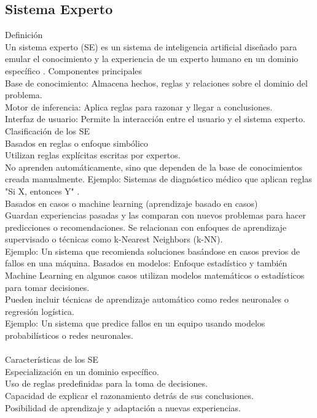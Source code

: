 \subsection{Sistema Experto}
Definición \\
Un sistema experto (SE) es un sistema de inteligencia artificial diseñado para emular el conocimiento y la experiencia de un experto humano en un dominio específico \cite{Leo}.
Componentes principales \\
Base de conocimiento: Almacena hechos, reglas y relaciones sobre el dominio del problema.\\
Motor de inferencia: Aplica reglas para razonar y llegar a conclusiones.\\
Interfaz de usuario: Permite la interacción entre el usuario y el sistema experto.\\
Clasificación de los SE \\
Basados en reglas o enfoque simbólico \\
Utilizan reglas explícitas escritas por expertos.\\
No aprenden automáticamente, sino que dependen de la base de conocimientos creada manualmente.
Ejemplo: Sistemas de diagnóstico médico que aplican reglas "Si X, entonces Y" \cite{Raul}.\\

Basados en casos o machine learning (aprendizaje basado en casos)\\
Guardan experiencias pasadas y las comparan con nuevos problemas para hacer predicciones o recomendaciones.
Se relacionan con enfoques de aprendizaje supervisado o técnicas como k-Nearest Neighbors (k-NN).\\
Ejemplo: Un sistema que recomienda soluciones basándose en casos previos de fallos en una máquina.
Basados en modelos: Enfoque estadístico y también Machine Learning en algunos casos
utilizan modelos matemáticos o estadísticos para tomar decisiones.\\
Pueden incluir técnicas de aprendizaje automático como redes neuronales o regresión logística.\\
Ejemplo: Un sistema que predice fallos en un equipo usando modelos probabilísticos o redes neuronales.\\
\\
Características de los SE\\
Especialización en un dominio específico.\\
Uso de reglas predefinidas para la toma de decisiones.\\
Capacidad de explicar el razonamiento detrás de sus conclusiones.\\
Posibilidad de aprendizaje y adaptación a nuevas experiencias\cite{Raul}.\\


